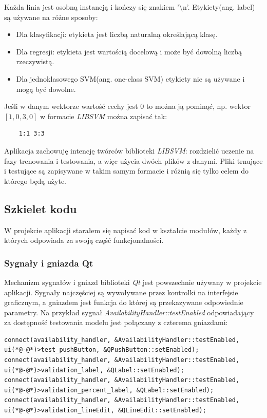 \documentclass[paper=a4, fontsize=11pt]{scrartcl} %
\numberwithin{equation}{section} %
\numberwithin{figure}{section} %
\begin{document}
    \par Każda linia jest osobną instancją i kończy się znakiem '\textbackslash n'.
    Etykiety(ang. label) są używane na różne sposoby: \cite{CC01a}
    \begin{itemize}
        \item Dla klasyfikacji: etykieta jest liczbą naturalną określającą klasę.
        \item Dla regresji: etykieta jest wartością docelową i może być dowolną liczbą
            rzeczywistą.
        \item Dla jednoklasowego SVM(ang. one-class SVM) etykiety nie są używane i mogą być
            dowolne.
    \end{itemize}

    Jeśli w danym wektorze wartość cechy jest 0 to można ją pominąć, np. wektor $[1, 0, 3, 0]$
    w formacie \textit{LIBSVM} można zapisać tak:
    \begin{verbatim}
    1:1 3:3
    \end{verbatim}

    Aplikacja zachowuję intencję twórców biblioteki \textit{LIBSVM}: rozdzielić uczenie na fazy
    trenowania i testowania, a więc użycia dwóch plików z danymi. Pliki trnujące i testujące są
    zapisywane w takim samym formacie i różnią się tylko celem do którego będą użyte.

    \subsection{Szkielet kodu}
    \par W projekcie aplikacji starałem się napisać kod w kształcie modułów, każdy z których
    odpowiada za swoją część funkcjonalności.

    \subsubsection{Sygnały i gniazda Qt}
    \par Mechanizm sygnałów i gniazd biblioteki \textit{Qt} \cite{qtsignalslot} jest powszechnie używany w projekcie
    aplikacji. Sygnały najczęściej są wywoływane przez kontrolki na interfejsie graficznym, a
    gniazdem jest funkcja do której są przekazywane odpowiednie parametry. Na przykład sygnał
    \textit{AvailabilityHandler::testEnabled} odpowiadający za dostępność testowania modelu
    jest połączany z czterema gniazdami: 
    \newpage
    \begin{lstlisting}
connect(availability_handler, &AvailabilityHandler::testEnabled, ui(*@-@*)>test_pushButton, &QPushButton::setEnabled);
connect(availability_handler, &AvailabilityHandler::testEnabled, ui(*@-@*)>validation_label, &QLabel::setEnabled);
connect(availability_handler, &AvailabilityHandler::testEnabled, ui(*@-@*)>validation_percent_label, &QLabel::setEnabled);
connect(availability_handler, &AvailabilityHandler::testEnabled, ui(*@-@*)>validation_lineEdit, &QLineEdit::setEnabled);
    \end{lstlisting}
\end{document}
